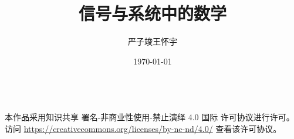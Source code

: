 \documentclass{ctexbook}
\title{信号与系统中的数学}
\author{严子竣\quad 王怀宇}
\date{\today}
\begin{document}



\vfill 

\begin{center}
    {\huge\faCreativeCommons\ \faCreativeCommonsBy\ \faCreativeCommonsNc\ \faCreativeCommonsNd} \\[1em]
    {\large 本作品采用知识共享 署名-非商业性使用-禁止演绎 4.0 国际 许可协议进行许可。} \\
    {\small 访问 \url{https://creativecommons.org/licenses/by-nc-nd/4.0/} 查看该许可协议。}
\end{center}

\newpage
\renewcommand{\contentsname}{简要目录}
\tableofcontents

\clearpage

\renewcommand{\contentsname}{详尽目录}
\setcounter{tocdepth}{2}
\tableofcontents%
\mainmatter%



















\printbibliography[heading=bibintoc, title={参考文献}]
\end{document}
